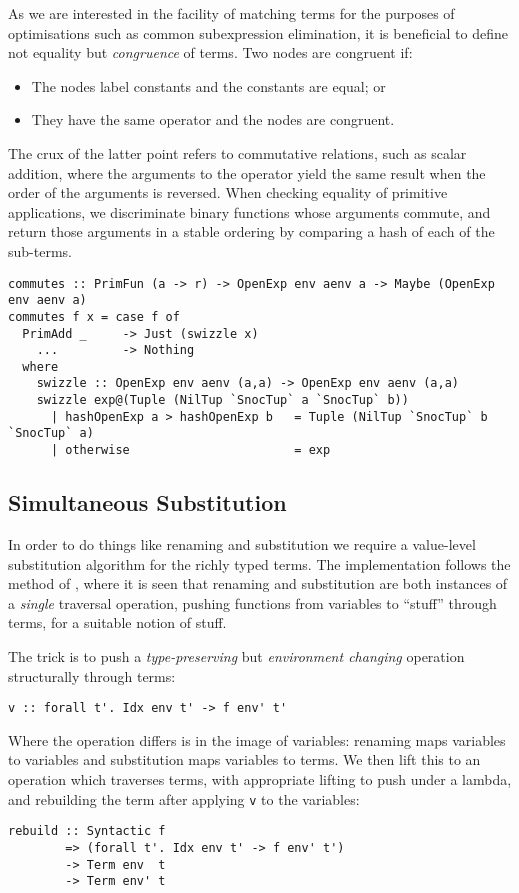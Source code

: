 As we are interested in the facility of matching terms for the purposes of
optimisations such as common subexpression elimination, it is beneficial to
define not equality but \emph{congruence} of terms. Two nodes are congruent if:
%
\begin{itemize}
    \item The nodes label constants and the constants are equal; or
    \item They have the same operator and the nodes are congruent.
\end{itemize}
%
The crux of the latter point refers to commutative relations, such as scalar
addition, where the arguments to the operator yield the same result when the
order of the arguments is reversed. When checking equality of primitive
applications, we discriminate binary functions whose arguments commute, and
return those arguments in a stable ordering by comparing a hash of each of the
sub-terms.
%
%
\begin{lstlisting}[style=haskell]
commutes :: PrimFun (a -> r) -> OpenExp env aenv a -> Maybe (OpenExp env aenv a)
commutes f x = case f of
  PrimAdd _     -> Just (swizzle x)
    ...         -> Nothing
  where
    swizzle :: OpenExp env aenv (a,a) -> OpenExp env aenv (a,a)
    swizzle exp@(Tuple (NilTup `SnocTup` a `SnocTup` b))
      | hashOpenExp a > hashOpenExp b   = Tuple (NilTup `SnocTup` b `SnocTup` a)
      | otherwise                       = exp
\end{lstlisting}
%


\subsection{Simultaneous Substitution}
\label{sec:substitution}

In order to do things like renaming and substitution we require a value-level
substitution algorithm for the richly typed terms. The implementation follows
the method of \citet{McBride:2006,McBride:2005}, where it is seen that renaming
and substitution are both instances of a \emph{single} traversal operation,
pushing functions from variables to ``stuff'' through terms, for a suitable
notion of stuff.

The trick is to push a \emph{type-preserving} but \emph{environment changing}
operation structurally through terms:
%
\begin{lstlisting}[style=haskell]
v :: forall t'. Idx env t' -> f env' t'
\end{lstlisting}
%
Where the operation differs is in the image of variables: renaming maps
variables to variables and substitution maps variables to terms. We then lift
this to an operation which traverses terms, with appropriate lifting to push
under a lambda, and rebuilding the term after applying \texttt{v} to the
variables:
%
\begin{lstlisting}[style=haskell,mathescape]
rebuild :: Syntactic f
        => (forall t'. Idx env t' -> f env' t')
        -> Term env  t
        -> Term env' t
\end{lstlisting}

